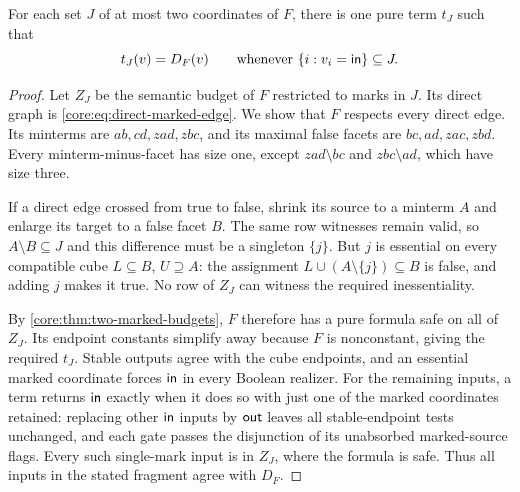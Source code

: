 \begin{corollary}
\label{core:cor:canonical-pair-locality}
For each set $J$ of at most two coordinates of $F$, there is one pure
term $t_J$ such that
\[
 t_J(v)=D_F(v)\qquad
 \text{whenever }\{i:v_i=\mathsf{in}\}\subseteq J.
\]
\end{corollary}
\begin{proof}
Let $Z_J$ be the semantic budget of $F$ restricted to marks in $J$.
Its direct graph is \eqref{core:eq:direct-marked-edge}. We show that
$F$ respects every direct edge. Its minterms are $ab,cd,zad,zbc$, and
its maximal false facets are $bc,ad,zac,zbd$. Every minterm-minus-facet
has size one, except $zad\setminus bc$ and $zbc\setminus ad$, which
have size three.

If a direct edge crossed from true to false, shrink its source to a
minterm $A$ and enlarge its target to a false facet $B$. The same row
witnesses remain valid, so $A\setminus B\subseteq J$ and this difference
must be a singleton $\{j\}$. But $j$ is essential on every compatible
cube $L\subseteq B$, $U\supseteq A$: the assignment
$L\cup(A\setminus\{j\})\subseteq B$ is false, and adding $j$ makes
it true. No row of $Z_J$ can witness the required inessentiality.

By \cref{core:thm:two-marked-budgets}, $F$ therefore has a pure formula
safe on all of $Z_J$. Its endpoint constants simplify away because $F$
is nonconstant, giving the required $t_J$.
Stable outputs agree with the cube endpoints, and an essential marked
coordinate forces $\mathsf{in}$ in every Boolean realizer. For the remaining
inputs, a term returns $\mathsf{in}$ exactly when it does so with just one of
the marked coordinates retained: replacing other $\mathsf{in}$ inputs by
$\mathsf{out}$ leaves all stable-endpoint tests unchanged, and each gate
passes the disjunction of its unabsorbed marked-source flags.
Every such single-mark input is in $Z_J$, where the formula is safe.
Thus all inputs in the stated fragment agree with $D_F$.
\end{proof}
